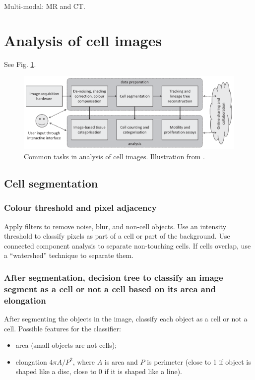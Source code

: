 \documentclass[11pt]{article} %
\begin{document}
Multi-modal: MR and CT.

\section{Analysis of cell images}
See Fig. \ref{fig:cells}.
\begin{figure}[h!]
  \centering
  \includegraphics[width= \linewidth]{cells.png}
  \caption{Common tasks in analysis of cell images. Illustration from \cite{kan:machine}.}
  \label{fig:cells}
\end{figure}
  \subsection{Cell segmentation}
    \subsubsection{Colour threshold and pixel adjacency}
Apply filters to remove noise, blur, and non-cell objects. Use an intensity threshold to classify pixels as part of a cell or part of the background. Use connected component analysis to separate non-touching cells. If cells overlap, use a ``watershed'' technique to separate them.

    \subsubsection{After segmentation, decision tree to classify an image segment as a cell or not a cell based on its area and elongation \cite{kan:machine}}
After segmenting the objects in the image, classify each object as a cell or not a cell. Possible features for the classifier:
\begin{itemize}
  \item area (small objects are not cells);
  \item elongation $4 \pi A / P^2$, where $A$ is area and $P$ is perimeter (close to 1 if object is shaped like a disc, close to 0 if it is shaped like a line).
\end{itemize}
\end{document}
